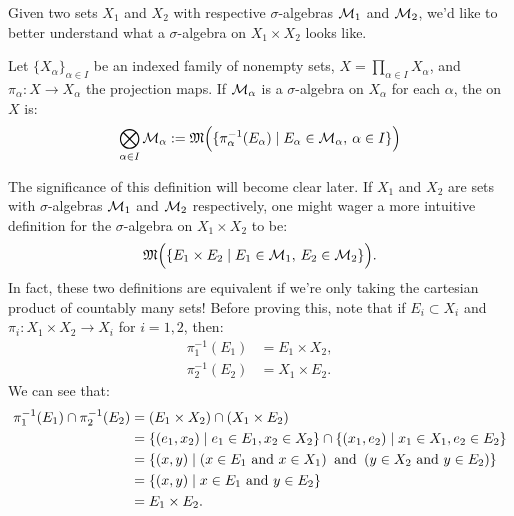     Given two sets $X_1$ and $X_2$ with respective $\sigma$-algebras $\cM_1$ and $\cM_2$, we'd like to better understand what a $\sigma$-algebra on $X_1 \times X_2$ looks like. 

    \begin{definition}
        Let $\{X_\alpha\}_{\alpha \in I}$ be an indexed family of nonempty sets, $X = \prod_{\alpha \in I}X_\alpha$, and $\pi_\alpha:X \rightarrow X_\alpha$ the projection maps. If $\cM_\alpha$ is a $\sigma$-algebra on $X_\alpha$ for each $\alpha$, the  on $X$ is:
            \begin{equation*}
            \begin{split}
                \bigotimes_{\alpha \in I}\cM_\alpha := \fM \Bigl(\{\pi_\alpha^{-1}(E_\alpha) \mid E_\alpha \in \cM_\alpha, \h2 \alpha \in I\}\Bigr)
            \end{split}
            \end{equation*}
    \end{definition}

    The significance of this definition will become clear later. If $X_1$ and $X_2$ are sets with $\sigma$-algebras $\cM_1$ and $\cM_2$ respectively, one might wager a more intuitive definition for the $\sigma$-algebra on $X_1 \times X_2$ to be:
        \begin{equation*}
        \begin{split}
            \fM \Bigl(\{E_1 \times E_2 \mid E_1 \in \cM_1,\h2 E_2 \in \cM_2\}\Bigr).
        \end{split}
        \end{equation*} 
    In fact, these two definitions are equivalent if we're only taking the cartesian product of countably many sets! Before proving this, note that if $E_i \subset X_i$ and $\pi_i:X_1 \times X_2 \rightarrow X_i$ for $i=1,2$, then:
        \begin{equation*}
        \begin{split}
            \pi_1^{-1}(E_1) &= E_1 \times X_2,\\
            \pi_2^{-1}(E_2) &= X_1 \times E_2.
        \end{split}
        \end{equation*}
    We can see that:
        \begin{equation*}
        \begin{split}
            \pi_1^{-1}(E_1) \cap \pi_2^{-1}(E_2)
            & = (E_1 \times X_2) \cap (X_1 \times E_2) \\
            & = \{(e_1,x_2) \mid e_1 \in E_1, x_2 \in X_2 \} \cap \{(x_1,e_2) \mid x_1 \in X_1, e_2 \in E_2\} \\
            & = \{(x,y) \mid (x \in E_1\text{ and } x \in X_1) \h2\text{ and }\h2 (y \in X_2 \text{ and } y \in E_2)\} \\
            & = \{(x,y) \mid x \in E_1 \text{ and } y \in E_2 \} \\
            & = E_1 \times E_2.
        \end{split}
        \end{equation*}

